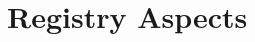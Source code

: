 \documentclass[11pt,a4paper]{ivoa}
\begin{document}
%
%
%
%
%

\section{Registry Aspects}
\label{sec:registry}
\end{document}
